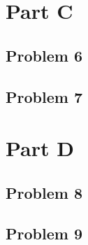 \documentclass[11pt]{article}
\begin{document}
\section*{Part C}

\subsection*{Problem 6}

\subsection*{Problem 7}

\section*{Part D}

\subsection*{Problem 8}

\subsection*{Problem 9}
\end{document}
